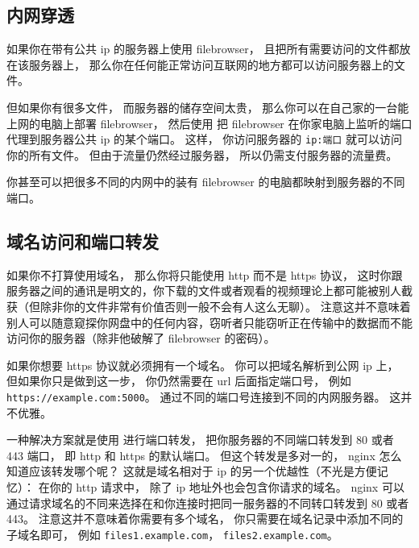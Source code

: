 \subsection{内网穿透}

如果你在带有公共 ip 的服务器上使用 filebrowser， 且把所有需要访问的文件都放在该服务器上， 那么你在任何能正常访问互联网的地方都可以访问服务器上的文件。

但如果你有很多文件， 而服务器的储存空间太贵， 那么你可以在自己家的一台能上网的电脑上部署 filebrowser， 然后使用  把 filebrowser 在你家电脑上监听的端口代理到服务器公共 ip 的某个端口。 这样， 你访问服务器的 \verb`ip:端口` 就可以访问你的所有文件。 但由于流量仍然经过服务器， 所以仍需支付服务器的流量费。

你甚至可以把很多不同的内网中的装有 filebrowser 的电脑都映射到服务器的不同端口。

\subsection{域名访问和端口转发}

如果你不打算使用域名， 那么你将只能使用 http 而不是 https 协议， 这时你跟服务器之间的通讯是明文的，你下载的文件或者观看的视频理论上都可能被别人截获（但除非你的文件非常有价值否则一般不会有人这么无聊）。 注意这并不意味着别人可以随意窥探你网盘中的任何内容，窃听者只能窃听正在传输中的数据而不能访问你的服务器（除非他破解了 filebrowser 的密码）。

如果你想要 https 协议就必须拥有一个域名。 你可以把域名解析到公网 ip 上， 但如果你只是做到这一步， 你仍然需要在 url 后面指定端口号， 例如 \verb`https://example.com:5000`。 通过不同的端口号连接到不同的内网服务器。 这并不优雅。

一种解决方案就是使用  进行端口转发， 把你服务器的不同端口转发到 80 或者 443 端口， 即 http 和 https 的默认端口。 但这个转发是多对一的， nginx 怎么知道应该转发哪个呢？ 这就是域名相对于 ip 的另一个优越性（不光是方便记忆）： 在你的 http 请求中， 除了 ip 地址外也会包含你请求的域名。 nginx 可以通过请求域名的不同来选择在和你连接时把同一服务器的不同转口转发到 80 或者 443。 注意这并不意味着你需要有多个域名， 你只需要在域名记录中添加不同的子域名即可， 例如 \verb`files1.example.com`， \verb`files2.example.com`。

